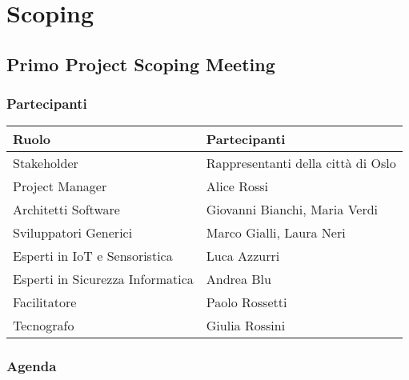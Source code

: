 \chapter{Scoping}

\section{Primo Project Scoping Meeting}

\subsection{Partecipanti}


\begin{center}
    \begin{tabular}{|l|l|}
      \hline
      \textbf{Ruolo} & \textbf{Partecipanti} \\
      \hline
      Stakeholder & Rappresentanti della città di Oslo \\
      \hline
      Project Manager & Alice Rossi \\
      \hline
      Architetti Software & Giovanni Bianchi, Maria Verdi \\
      \hline
      Sviluppatori Generici & Marco Gialli, Laura Neri \\
      \hline
      Esperti in IoT e Sensoristica & Luca Azzurri \\
      \hline
      Esperti in Sicurezza Informatica & Andrea Blu \\
      \hline
      Facilitatore & Paolo Rossetti \\
      \hline
      Tecnografo & Giulia Rossini \\
      \hline
    \end{tabular}
\end{center}

\subsection{Agenda}

